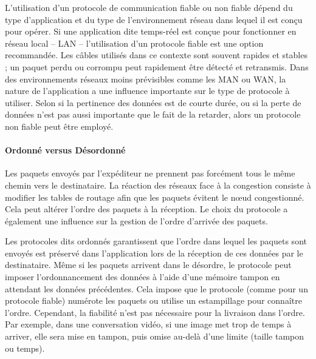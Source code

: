 L'utilisation d'un protocole de communication fiable ou non fiable dépend du 
type d'application et du type de l'environnement réseau dans lequel il est conçu 
pour opérer. Si une application dite temps-réel est conçue pour fonctionner en réseau 
local -- \gls{LAN} -- l'utilisation d'un protocole fiable est une option recommandée. 
Les câbles utilisés dans ce contexte sont souvent rapides et stables ; un paquet 
perdu ou corrompu peut rapidement être détecté et retransmis. Dans des 
environnements réseaux moins prévisibles comme les \gls{MAN} ou 
\gls{WAN}, la nature de l'application a une influence importante sur le type de 
protocole à utiliser. Selon si la pertinence des données est de courte durée, ou si 
la perte de données n'est pas aussi importante que le fait de la retarder, alors un 
protocole non fiable peut être employé.


\paragraph{Ordonné versus Désordonné}
\label{sec:ordre}
Les paquets envoyés par l'expéditeur ne prennent pas forcément tous le même 
chemin vers le destinataire. La réaction des réseaux face à la congestion consiste à 
modifier les tables de routage afin que les paquets évitent le n\oe ud congestionné. 
Cela peut altérer l'ordre des paquets à la réception. Le choix du protocole a 
également une influence sur la gestion de l'ordre d'arrivée des paquets.

Les protocoles dits \og ordonnés\fg{} garantissent que l'ordre dans lequel les 
paquets sont envoyés est préservé dans l'application lors de la réception de ces 
données par le destinataire. Même si les paquets arrivent dans le désordre, le 
protocole peut imposer l'ordonnancement des données à l'aide d'une mémoire 
tampon en attendant les données précédentes. Cela impose que le protocole 
(comme pour un protocole fiable) numérote les paquets ou utilise un estampillage 
pour connaître l'ordre. Cependant, la fiabilité n'est pas nécessaire pour la livraison 
dans l'ordre. Par exemple, dans une conversation vidéo, si une image met trop de 
temps à arriver, elle sera mise en tampon, puis omise au-delà d'une limite (taille 
tampon ou temps).

